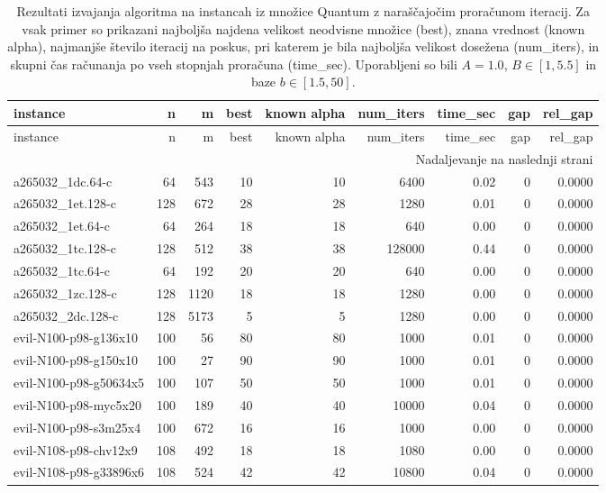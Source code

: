 {\setlength{\LTcapwidth}{\textwidth}
\begin{longtable}{lrrrrrrrr}
\caption{Rezultati izvajanja algoritma na instancah iz množice Quantum z naraščajočim proračunom iteracij. Za vsak primer so prikazani najboljša najdena velikost neodvisne množice (best), znana vrednost (known alpha), najmanjše število iteracij na poskus, pri katerem je bila najboljša velikost dosežena (num\_iters), in skupni čas računanja po vseh stopnjah proračuna (time\_sec). Uporabljeni so bili $A = 1.0$, $B \in [1, 5.5]$ in baze $b \in [1.5, 50]$.} \label{tab:results_budget_tiers_quantum} \\
\toprule
instance & n & m & best & known alpha & num\_iters & time\_sec & gap & rel\_gap \\
\midrule
\endfirsthead
\toprule
instance & n & m & best & known alpha & num\_iters & time\_sec & gap & rel\_gap \\
\midrule
\endhead
\midrule
\multicolumn{9}{r}{Nadaljevanje na naslednji strani} \\
\endfoot
\bottomrule
\endlastfoot
a265032\_1dc.64-c & 64 & 543 & 10 & 10 & 6400 & 0.02 & 0 & 0.0000 \\
a265032\_1et.128-c & 128 & 672 & 28 & 28 & 1280 & 0.01 & 0 & 0.0000 \\
a265032\_1et.64-c & 64 & 264 & 18 & 18 & 640 & 0.00 & 0 & 0.0000 \\
a265032\_1tc.128-c & 128 & 512 & 38 & 38 & 128000 & 0.44 & 0 & 0.0000 \\
a265032\_1tc.64-c & 64 & 192 & 20 & 20 & 640 & 0.00 & 0 & 0.0000 \\
a265032\_1zc.128-c & 128 & 1120 & 18 & 18 & 1280 & 0.00 & 0 & 0.0000 \\
a265032\_2dc.128-c & 128 & 5173 & 5 & 5 & 1280 & 0.00 & 0 & 0.0000 \\
evil-N100-p98-g136x10 & 100 & 56 & 80 & 80 & 1000 & 0.01 & 0 & 0.0000 \\
evil-N100-p98-g150x10 & 100 & 27 & 90 & 90 & 1000 & 0.01 & 0 & 0.0000 \\
evil-N100-p98-g50634x5 & 100 & 107 & 50 & 50 & 1000 & 0.01 & 0 & 0.0000 \\
evil-N100-p98-myc5x20 & 100 & 189 & 40 & 40 & 10000 & 0.04 & 0 & 0.0000 \\
evil-N100-p98-s3m25x4 & 100 & 672 & 16 & 16 & 1000 & 0.00 & 0 & 0.0000 \\
evil-N108-p98-chv12x9 & 108 & 492 & 18 & 18 & 1080 & 0.00 & 0 & 0.0000 \\
evil-N108-p98-g33896x6 & 108 & 524 & 42 & 42 & 10800 & 0.04 & 0 & 0.0000 \\

\end{longtable}}
